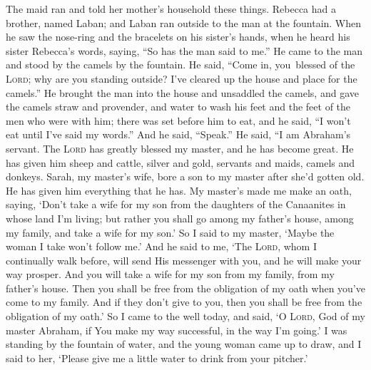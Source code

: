\begin{inparaenum}
     The maid ran and told her mother's household these things.%
     Rebecca had a brother, named Laban; and Laban ran outside to the man at the fountain.%
     When he saw the nose-ring and the bracelets on his sister's hands, when he heard his sister Rebecca's words, saying, ``So has the man said to me.'' He came to the man and stood by the camels by the fountain.%
     He said, ``Come in, you\understood\ blessed of the \textsc{Lord}; why are you standing outside? I've cleared up the house and place for the camels.''%
     He brought the man into the house and unsaddled the camels, and gave the camels straw and provender, and water to wash his feet and the feet of the men who were with him;%
     there was set before him to eat, and he said, ``I won't eat until I've said my words.'' And he said, ``Speak.''%
     He said, ``I am Abraham's servant.%
     The \textsc{Lord} has greatly blessed my master, and he has become great. He has given him sheep and cattle, silver and gold, servants and maids, camels and donkeys.%
     Sarah, my master's wife, bore a son to my master after she'd gotten old. He has given him everything that he has.%
     My master's made me make an oath, saying, `Don't take a wife for my son from the daughters of the Canaanites in whose land I'm living;%
     but rather you shall go among my father's house, among my family, and take a wife for my son.'%
     So I said to my master, `Maybe the woman I take won't follow me.'%
     And he said to me, `The \textsc{Lord}, whom I continually walk before, will send His messenger with you, and he will make your way prosper. And you will take a wife for my son from my family, from my father's house.%
     Then you shall be free from the obligation of my oath when you've come to my family. And if they don't give to you, then you shall be free from the obligation of my oath.'%
     So I came to the well today, and said, `O \textsc{Lord}, God of my master Abraham, if You make my way successful, in the way I'm going.'%
     I was standing by the fountain of water, and the young woman came up to draw, and I said to her, `Please give me a little water to drink from your pitcher.'%

\end{inparaenum}
